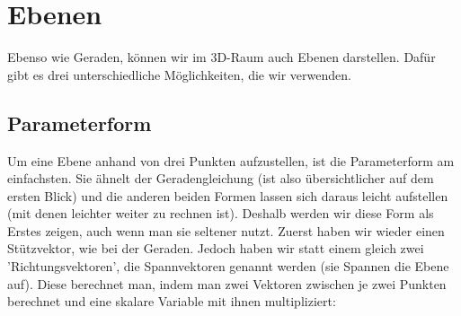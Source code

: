 \section{Ebenen}
	Ebenso wie Geraden, können wir im 3D-Raum auch Ebenen darstellen. Dafür gibt es
	drei unterschiedliche Möglichkeiten, die wir verwenden.

	\subsection{Parameterform}
		Um eine Ebene anhand von drei Punkten aufzustellen, ist die Parameterform am
		einfachsten. Sie ähnelt der Geradengleichung (ist also übersichtlicher auf dem
		ersten Blick) und die anderen beiden Formen lassen sich daraus leicht
		aufstellen (mit denen leichter weiter zu rechnen ist). Deshalb werden wir
		diese Form als Erstes zeigen, auch wenn man sie seltener nutzt. Zuerst haben
		wir wieder einen Stützvektor, wie bei der Geraden. Jedoch haben wir statt
		einem gleich zwei 'Richtungsvektoren', die Spannvektoren genannt werden (sie
		Spannen die Ebene auf). Diese berechnet man, indem man zwei Vektoren zwischen
		je zwei Punkten berechnet und eine skalare Variable mit ihnen multipliziert:
		\\ \\
		\formel{\[E:\ \vec{x}=\vec{a}+s\cdot \vec{b}+t\cdot \vec{c}\]}

